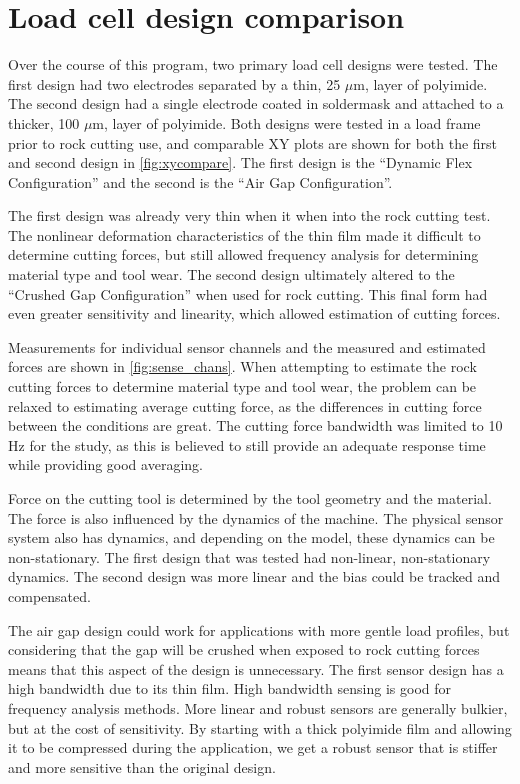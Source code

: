 \chapter{Load cell design comparison
\label{chap:8}}

Over the course of this program, two primary load cell designs were tested.
The first design had two electrodes separated by a thin, 25 $\mu$m, layer of polyimide.
The second design had a single electrode coated in soldermask 
and attached to a thicker, 100 $\mu$m, layer of polyimide.
Both designs were tested in a load frame prior to rock cutting use,
and comparable XY plots are shown for both the first and second design
in \ref{fig:xycompare}. The first design is the ``Dynamic Flex Configuration'' 
and the second is the ``Air Gap Configuration''.

The first design was already very thin when it when into the rock cutting test.
The nonlinear deformation characteristics of the thin film made it difficult to determine
cutting forces, but still allowed frequency analysis for determining material type and tool wear.
The second design ultimately altered to the ``Crushed Gap Configuration'' when used for rock cutting.
This final form had even greater sensitivity and linearity, which allowed estimation of cutting forces.

Measurements for individual sensor channels and the measured 
and estimated forces are shown in \ref{fig:sense_chans}.
When attempting to estimate the rock cutting forces to determine material type and tool wear, 
the problem can be relaxed to estimating average cutting force, as the differences in 
cutting force between the conditions are great.
The cutting force bandwidth was limited to 10 Hz for the study, as this is believed to still
provide an adequate response time while providing good averaging.

Force on the cutting tool is determined by the tool geometry and the material.
The force is also influenced by the dynamics of the machine.
The physical sensor system also has dynamics, and depending on the model, 
these dynamics can be non-stationary.
The first design that was tested had non-linear, non-stationary dynamics.
The second design was more linear and the bias could be tracked and compensated.

The air gap design could work for applications with more gentle load profiles,
but considering that the gap will be crushed when exposed to rock cutting forces 
means that this aspect of the design is unnecessary. The first sensor design
has a high bandwidth due to its thin film. 
High bandwidth sensing is good for frequency analysis methods.
More linear and robust sensors are generally bulkier, but at the cost of sensitivity.
By starting with a thick polyimide film and allowing it to be compressed during the application,
we get a robust sensor that is stiffer and more sensitive than the original design.



